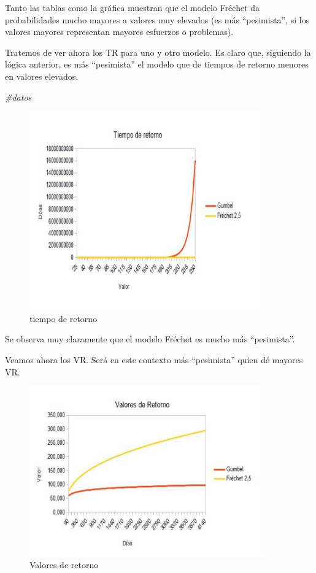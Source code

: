 \documentclass[
  oneside]{article}
\newenvironment{Shaded}{\begin{snugshade}}{\end{snugshade}}
\newcommand{\CommentTok}[1]{\textcolor[rgb]{0.56,0.35,0.01}{\textit{#1}}}
\begin{document}
Tanto las tablas como la gráfica muestran que el modelo Fréchet da
probabilidades mucho mayores a valores muy elevados (es más
``pesimista'', si los valores mayores representan mayores esfuerzos o
problemas).

Tratemos de ver ahora los TR para uno y otro modelo. Es claro que,
siguiendo la lógica anterior, es más ``pesimista'' el modelo que de
tiempos de retorno menores en valores elevados.

\begin{Shaded}
\begin{Highlighting}[]
\CommentTok{\#datos}
\end{Highlighting}
\end{Shaded}

\begin{figure}
\centering
\includegraphics[width=0.9\textwidth,height=\textheight]{images/p5.png}
\caption{tiempo de retorno}
\end{figure}

Se observa muy claramente que el modelo Fréchet es mucho más
``pesimista''.

Veamos ahora los VR. Será en este contexto más ``pesimista'' quien dé
mayores VR.

\begin{figure}
\centering
\includegraphics[width=0.9\textwidth,height=\textheight]{images/p6.png}
\caption{Valores de retorno}
\end{figure}
\end{document}
